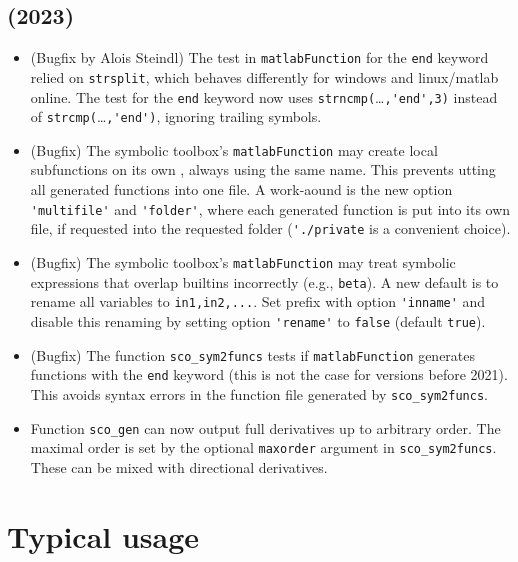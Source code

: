 \documentclass[11pt]{scrartcl}
\newcommand{\blist}[1]{\mbox{\lstinline!#1!}}
\begin{document}
\subsection*{(2023)}
\label{sec:2023}
\begin{itemize}
\item (Bugfix by Alois Steindl) The test in \blist{matlabFunction} for
  the \blist{end} keyword relied on \blist{strsplit}, which behaves
  differently for windows and linux/matlab online. The test for the
  \blist{end} keyword now uses \blist{strncmp(}\ldots\blist{,'end',3)} instead of
  \blist{strcmp(}\ldots\blist{,'end')}, ignoring trailing symbols.
\item (Bugfix) The symbolic toolbox's \blist{matlabFunction} may
  create local subfunctions on its own , always using the same
  name. This prevents utting all generated functions into one file. A
  work-aound is the new option \blist{'multifile'} and
  \blist{'folder'}, where each generated function is put into its own
  file, if requested into the requested folder (\blist{'./private} is
  a convenient choice).
\item (Bugfix) The symbolic toolbox's \blist{matlabFunction} may treat
  symbolic expressions that overlap builtins incorrectly (e.g.,
  \blist{beta}). A new default is to rename all variables to
  \blist{in1,in2,...}. Set prefix with option \blist{'inname'} and
  disable this renaming by setting option \blist{'rename'} to
  \blist{false} (default \blist{true}).
\item (Bugfix) The function \blist{sco_sym2funcs} tests if \blist{matlabFunction} generates
  functions with the \blist{end} keyword (this is not the case for
  versions before 2021). This avoids syntax errors in the function file generated by \blist{sco_sym2funcs}.
\item Function \blist{sco_gen} can now output full derivatives up to
  arbitrary order. The maximal order is set by the optional
  \blist{maxorder} argument in \blist{sco_sym2funcs}. These can be
  mixed with directional derivatives.
\end{itemize}
\section{Typical usage}
\label{sec:minimal}
\end{document}
